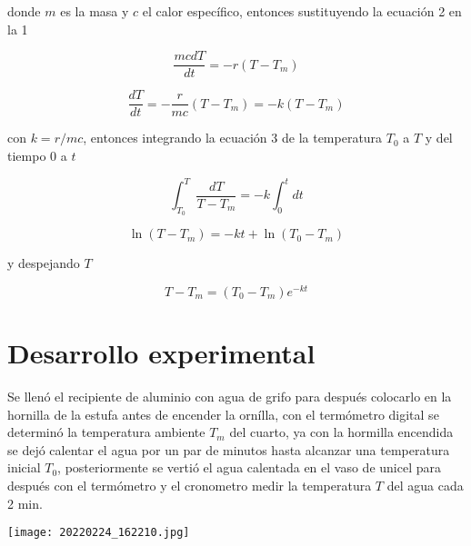 \documentclass[DIV=calc, paper=a4, fontsize=11pt]{scrartcl}
\newenvironment{Figura}
  {\par\medskip\noindent\minipage{\linewidth}}
  {\endminipage\par\medskip}
\begin{document}
\begin{multicols}{2}
\noindent donde $m$ es la masa y $c$ el calor específico, entonces sustituyendo la ecuación 2 en la 1


\begin{equation*}
    \frac{m c dT}{dt} = -r (T-T_m) 
\end{equation*}

\begin{equation}
    \frac{dT}{dt} = -\frac{r}{mc} (T - T_m) = -k (T - T_m)
\end{equation}

\noindent con $k=r/mc$, entonces integrando la ecuación 3 de la temperatura $T_0$ a $T$ y del tiempo $0$ a $t$ 

\begin{equation*}
    \int_{T_0}^{T} \frac{dT}{T-T_m} = -k \int_{0}^{t} dt
\end{equation*}

\begin{equation*}
    \ln{(T-T_m)} = -kt+ \ln{(T_0 - T_m)}
\end{equation*}

\noindent y despejando $T$

\begin{equation}
    T  -T_m= (T_0 - T_m) e^{-kt} 
\end{equation}







\section*{Desarrollo experimental}

Se llenó el recipiente de aluminio con agua de grifo para después colocarlo en la hornilla de la estufa antes de encender la ornílla, con el termómetro digital se determinó la temperatura ambiente $T_m$ del cuarto, ya con la hormilla encendida se dejó calentar el agua por un par de minutos hasta alcanzar una temperatura inicial $T_0$, posteriormente se vertió el agua calentada en el vaso de unicel para después con el termómetro y el cronometro  medir la temperatura $T$ del agua cada 2 min.


\begin{Figura}
    \centering
    \texttt{[image: 20220224\_162210.jpg]}
    \label{fig}
\end{Figura}







\end{multicols}
\end{document}
